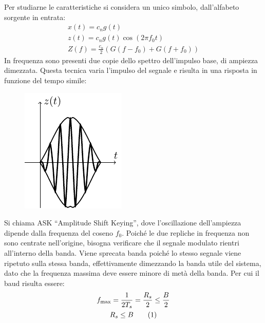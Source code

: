 \documentclass{article}
\newcommand{\tageq}{\tag{\stepcounter{equation}\theequation}}
\numberwithin{equation}{subsection}
\begin{document}
Per studiarne le caratteristiche si considera un unico simbolo, dall'alfabeto sorgente in entrata: 
\begin{gather*}
    x(t)=c_ng(t)\\
    z(t)=c_ng(t)\cos(2\pi f_0t)\\
    Z(f)=\displaystyle\frac{c_n}{2}\left(G(f-f_0)+G(f+f_0)\right)
\end{gather*}
In frequenza sono presenti due copie dello spettro dell'impulso base, di ampiezza dimezzata. 
Questa tecnica varia l'impulso del segnale e risulta in una risposta in funzione del tempo simile:
\begin{figure}[H]%
    \centering
    \includegraphics{ask.pdf}
\end{figure}
Si chiama ASK ``Amplitude Shift Keying'', dove l'oscillazione dell'ampiezza dipende dalla frequenza del coseno $f_0$. 
Poiché le due repliche in frequenza non sono centrate nell'origine, bisogna verificare che il segnale modulato rientri all'interno della banda. Viene sprecata banda poiché 
lo stesso segnale viene ripetuto sulla stessa banda, effettivamente dimezzando la banda utile del sistema, dato che la frequenza massima deve essere minore di metà della banda. 
Per cui il baud risulta essere:
\begin{gather*}
    f_{\max}=\displaystyle\frac{1}{2T_s}=\frac{R_s}{2}\leq\frac{B}{2}\\
    R_s\leq B\tageq
\end{gather*}
\end{document}
